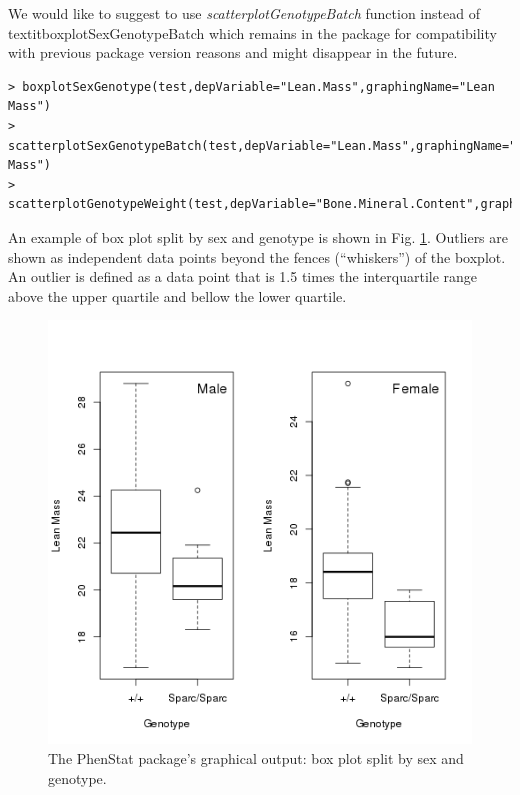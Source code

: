 \documentclass[12pt,a4paper]{article}
\begin{document}
We would like to suggest to use \textit{scatterplotGenotypeBatch} function instead of textit{boxplotSexGenotypeBatch} which remains in the package for compatibility with previous package version reasons and might disappear in the future. 

\begingroup
\fontsize{8pt}{12pt}\selectfont
\begin{verbatim}
> boxplotSexGenotype(test,depVariable="Lean.Mass",graphingName="Lean Mass")
> scatterplotSexGenotypeBatch(test,depVariable="Lean.Mass",graphingName="Lean Mass")
> scatterplotGenotypeWeight(test,depVariable="Bone.Mineral.Content",graphingName="BMC")
\end{verbatim}
\endgroup 


An example of box plot split by sex and genotype is shown in Fig. \ref{fig:07}. Outliers are shown as independent data points beyond the fences (``whiskers'') of the boxplot. An outlier is defined as a data point that is 1.5 times the interquartile range above the upper quartile and bellow the lower quartile.
\begin{figure}[!htpb]%
\centerline{\includegraphics[scale=0.5]{boxplotSexGenotype.png}}
\caption{The PhenStat package's graphical output: box plot split by sex and genotype.}\label{fig:07}
\end{figure}
\end{document}
